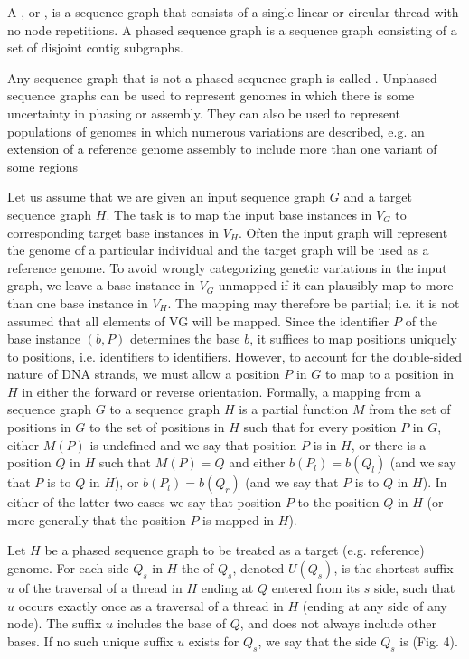 \documentclass[11pt,proposal]{ucthesis}
\begin{document}
A , or , is a sequence graph that consists of a single linear or circular thread with no node repetitions. A phased sequence graph is a sequence graph consisting of a set of disjoint contig subgraphs.

Any sequence graph that is not a phased sequence graph is called . Unphased sequence graphs can be used to represent genomes in which there is some uncertainty in phasing or assembly. They can also be used to represent populations of genomes in which numerous variations are described, e.g. an extension of a reference genome assembly to include more than one variant of some regions

Let us assume that we are given an input sequence graph $G$ and a target sequence graph $H$. The task is to map the input base instances in $V_G$ to corresponding target base instances in $V_H$. Often the input graph will represent the genome of a particular individual and the target graph will be used as a reference genome. To avoid wrongly categorizing genetic variations in the input graph, we leave a base instance in $V_G$ unmapped if it can plausibly map to more than one base instance in $V_H$. The mapping may therefore be partial; i.e. it is not assumed that all elements of VG will be mapped. Since the identifier $P$ of the base instance $(b,P)$ determines the base $b$, it suffices to map positions uniquely to positions, i.e. identifiers to identifiers. However, to account for the double-sided nature of DNA strands, we must allow a position $P$ in $G$ to map to a position in $H$ in either the forward or reverse orientation. Formally, a mapping from a sequence graph $G$ to a sequence graph $H$ is a partial function $M$ from the set of positions in $G$ to the set of positions in $H$ such that for every position $P$ in $G$, either $M(P)$ is undefined and we say that position $P$ is  in $H$, or there is a position $Q$ in $H$ such that $M(P) = Q$ and either $b(P_l) = b(Q_l)$ (and we say that $P$ is  to $Q$ in $H$), or $b(P_l) = b(Q_r)$ (and we say that $P$ is  to $Q$ in $H$). In either of the latter two cases we say that position $P$  to the position $Q$ in $H$ (or more generally that the position $P$ is mapped in $H$).  

Let $H$ be a phased sequence graph to be treated as a target (e.g. reference) genome. For each side $Q_s$ in $H$ the  of $Q_s$, denoted $U(Q_s)$, is the shortest suffix $u$ of the traversal of a thread in $H$ ending at $Q$ entered from its $s$ side, such that $u$ occurs exactly once as a traversal of a thread in $H$ (ending at any side of any node). The suffix $u$ includes the base of $Q$, and does not always include other bases. If no such unique suffix $u$ exists for $Q_s$, we say that the side $Q_s$ is  (Fig. 4).
\end{document}

